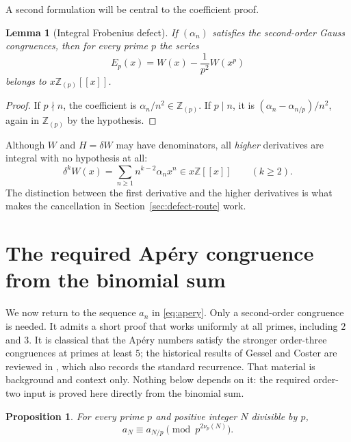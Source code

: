 \documentclass[11pt,letterpaper]{article}
\numberwithin{equation}{section}
\newtheorem{proposition}[theorem]{Proposition}
\newtheorem{lemma}[theorem]{Lemma}
\theoremstyle{definition}
\newcommand{\Z}{\mathbb Z}
\newcommand{\Zp}{\Z_{(p)}}
\newcommand{\dd}{\delta}
\begin{document}
A second formulation will be central to the coefficient proof.

\begin{lemma}[Integral Frobenius defect]\label{lem:defect}
If $(\alpha_n)$ satisfies the second-order Gauss congruences, then for
every prime $p$ the series
\begin{equation}\label{eq:defect}
E_p(x)=W(x)-\frac1{p^2}W(x^p)
\end{equation}
belongs to $x\Zp[[x]]$.
\end{lemma}

\begin{proof}
If $p\nmid n$, the coefficient is $\alpha_n/n^2\in\Zp$. If $p\mid n$,
it is $(\alpha_n-\alpha_{n/p})/n^2$, again in $\Zp$ by the hypothesis.
\end{proof}

Although $W$ and $H=\dd W$ may have denominators, all \emph{higher}
derivatives are integral with no hypothesis at all:
\begin{equation}\label{eq:higher-derivatives}
\dd^kW(x)=\sum_{n\geq1}n^{k-2}\alpha_nx^n\in x\Z[[x]]
\qquad(k\geq2).
\end{equation}
The distinction between the first derivative and the higher derivatives is
what makes the cancellation in Section~\ref{sec:defect-route} work.

\section{The required Ap\'ery congruence from the binomial sum}\label{sec:apery}

We now return to the sequence $a_n$ in \eqref{eq:apery}. Only a
second-order congruence is needed. It admits a short proof that works
uniformly at all primes, including $2$ and $3$.
It is classical that the Ap\'ery numbers satisfy the stronger order-three
congruences at primes at least $5$; the historical results of Gessel and
Coster are reviewed in \cite{liu}, which also records the standard
recurrence. That material is background and context only. Nothing below
depends on it: the required order-two input is proved here directly from
the binomial sum.

\begin{proposition}\label{prop:apery-gauss}
For every prime $p$ and positive integer $N$ divisible by $p$,
\begin{equation}\label{eq:apery-gauss}
a_N\equiv a_{N/p}\pmod{p^{2\nu_p(N)}}.
\end{equation}
\end{proposition}
\end{document}
